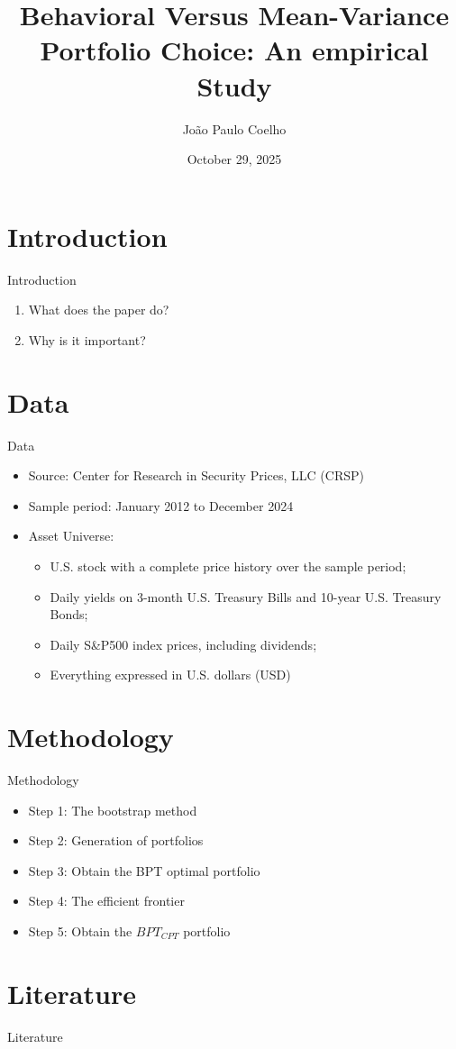 \documentclass[11pt]{beamer}
\title[Portfolio Choice]{Behavioral Versus Mean-Variance Portfolio Choice: An empirical Study}
\author{João Paulo Coelho}
\institute{ISCTE - IUL}
\date[Today]{October 29, 2025}
\begin{document}
\begin{frame}  %
\titlepage
\end{frame}

\begin{frame}
    \tableofcontents
\end{frame}

\section{Introduction}

\begin{frame}{Introduction}
    \begin{enumerate}
        \item What does the paper do?
        \item Why is it important?
    \end{enumerate}
\end{frame}

\section{Data}
\begin{frame}{Data}
    \begin{itemize}
        \item Source: Center for Research in Security Prices, LLC (CRSP)
        \item Sample period: January 2012 to December 2024
        \item Asset Universe: 
        \begin{itemize}
            \item U.S. stock with a complete price history over the sample period;
            \item Daily yields on 3-month U.S. Treasury Bills and 10-year U.S. Treasury Bonds;
            \item Daily S\&P500 index prices, including dividends;
            \item Everything expressed in U.S. dollars (USD)
        \end{itemize}
    \end{itemize}
\end{frame}

\section{Methodology}
\begin{frame}{Methodology}
    \begin{itemize}
        \item Step 1: The bootstrap method
        \item Step 2: Generation of portfolios
        \item Step 3: Obtain the BPT optimal portfolio
        \item Step 4: The efficient frontier
        \item Step 5: Obtain the $BPT_{CPT}$ portfolio
    \end{itemize}
\end{frame}

\section{Literature}
\begin{frame}{Literature}

\end{frame}
\end{document}
